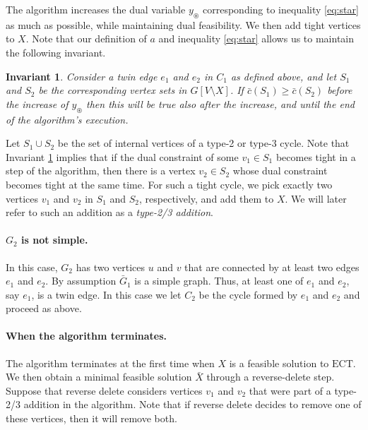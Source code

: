 \documentclass{article}
\newcommand{\ect}{\ensuremath{\mbox{ECT}}}
\newcommand{\0}{\mathbb{0}}
\newcommand{\1}{\mathbb{1}}
\newtheorem{inva}[theorem]{Invariant}
\begin{document}
The algorithm increases the dual variable $y_{\circledast}$ corresponding to
inequality \eqref{eq:star} as much as possible, while maintaining dual feasibility. 
We then add tight vertices to $X$. Note that our definition of $a$ and inequality 
\eqref{eq:star} allows us to maintain the following invariant.

\begin{inva}\label{inva}
  Consider a twin edge $e_1$ and $e_2$ in $C_1$ as defined above, and let $S_1$ and $S_2$
  be the corresponding vertex sets in $G[V\setminus X]$. If $\bar{c}(S_1) \geq \bar{c}
  (S_2)$ before the increase of $y_{\circledast}$ then this will be true also after the
  increase, and until the end of the algorithm's execution. 
\end{inva}

Let $S_1 \cup S_2$ be the set of internal vertices of a type-2 or type-3 cycle. Note that
Invariant \ref{inva} implies that if the dual constraint of some $v_1 \in S_1$ becomes
tight in a step of the algorithm, then there is a vertex $v_2 \in S_2$ whose dual
constraint becomes tight at the same time. For such a tight cycle, we pick exactly two
vertices
$v_1$ and $v_2$ in $S_1$ and $S_2$, respectively, and add them to $X$. We will later refer
to such an addition as a {\em type-2/3 addition}.

\paragraph{$G_2$ is not simple.}

In this case, $G_2$ has two vertices $u$ and $v$ that are connected by at least two edges
$e_1$ and $e_2$. By assumption $\bar{G}_1$ is a simple graph. Thus, at least one of $e_1$
and $e_2$, say $e_1$, is a twin edge. In this case we let $C_2$ be the cycle formed by
$e_1$ and $e_2$ and proceed as above.

\paragraph{When the algorithm terminates.}

The algorithm terminates at the first time when $X$ is a feasible solution to \ect. We
then obtain a minimal feasible solution $\bar{X}$ through a reverse-delete step. 
Suppose that reverse delete considers vertices $v_1$ and $v_2$ that were part of a
type-2/3 addition in the algorithm. Note that if reverse delete decides to remove one of
these vertices, then it will remove both. 
\end{document}
